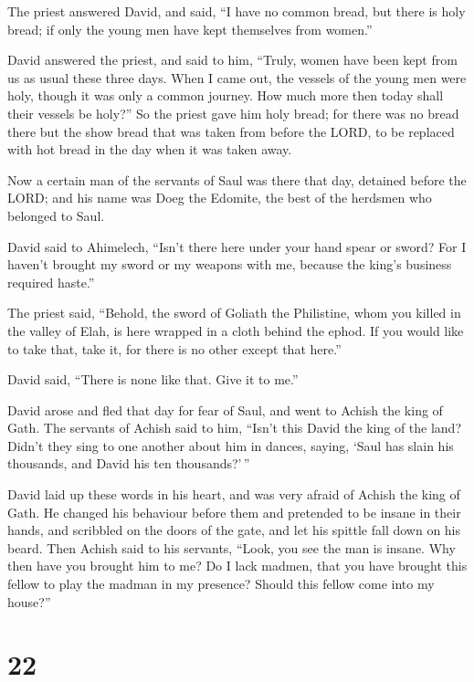  The priest answered David, and said, ``I have no common
bread, but there is holy bread; if only the young men have kept
themselves from women.''

 David answered the priest, and said to him, ``Truly,
women have been kept from us as usual these three days. When I came out,
the vessels of the young men were holy, though it was only a common
journey. How much more then today shall their vessels be holy?''
 So the priest gave him holy bread; for there was no bread
there but the show bread that was taken from before the LORD, to be
replaced with hot bread in the day when it was taken away.

 Now a certain man of the servants of Saul was there that
day, detained before the LORD; and his name was Doeg the Edomite, the
best of the herdsmen who belonged to Saul.

 David said to Ahimelech, ``Isn't there here under your
hand spear or sword? For I haven't brought my sword or my weapons with
me, because the king's business required haste.''

 The priest said, ``Behold, the sword of Goliath the
Philistine, whom you killed in the valley of Elah, is here wrapped in a
cloth behind the ephod. If you would like to take that, take it, for
there is no other except that here.''

David said, ``There is none like that. Give it to me.''

 David arose and fled that day for fear of Saul, and went
to Achish the king of Gath.  The servants of Achish said
to him, ``Isn't this David the king of the land? Didn't they sing to one
another about him in dances, saying, `Saul has slain his thousands, and
David his ten thousands?'\,''

 David laid up these words in his heart, and was very
afraid of Achish the king of Gath.  He changed his
behaviour before them and pretended to be insane in their hands, and
scribbled on the doors of the gate, and let his spittle fall down on his
beard.  Then Achish said to his servants, ``Look, you see
the man is insane. Why then have you brought him to me? 
Do I lack madmen, that you have brought this fellow to play the madman
in my presence? Should this fellow come into my house?''

\hypertarget{section-21}{%
\section{22}\label{section-21}}

